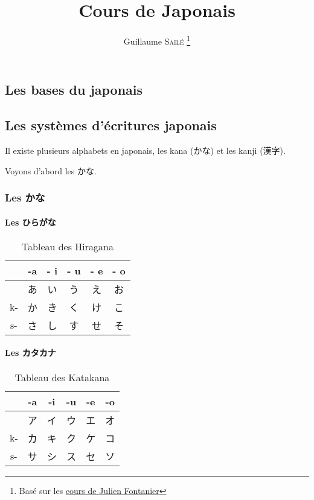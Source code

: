 \documentclass[a4paper]{report}
\title{Cours de Japonais}
\author{Guillaume \textsc{Sailé} \thanks{Basé sur les \href{https://www.youtube.com/channel/UChFfLNTK64xQj7NscGmLLLg}{cours de Julien Fontanier}}}
\date{}
\begin{document}
\begin{CJK}{UTF8}{goth}
\maketitle
\tableofcontents
\part{Les bases du japonais}
\chapter{Les systèmes d'écritures japonais}
Il existe plusieurs alphabets en japonais, les kana (かな) et les kanji (漢字).

Voyons d'abord les かな.
\section{Les かな}
\subsection{Les ひらがな}
\begin{table}[h]
\centering
\begin{tabular}{c|c c c c c}
    & -a & - i & - u & - e & - o\\
    \hline
    & あ & い & う & え & お\\
 k- & か & き & く & け & こ\\
 s- & さ & し & す & せ & そ\\
\end{tabular}
\caption*{Tableau des Hiragana}
\end{table}

\subsection{Les カタカナ}
\begin{table}[h]
\centering
\begin{tabular}{c|c c c c c}
    & -a & -i & -u & -e & -o\\
    \hline
    & ア & イ & ウ & エ & オ\\
 k- & カ & キ & ク & ケ & コ\\
 s- & サ & シ & ス & セ & ソ\\
\end{tabular}
\caption*{Tableau des Katakana}
\end{table}

\blindtext

\blindtext

\end{CJK}
\end{document}
